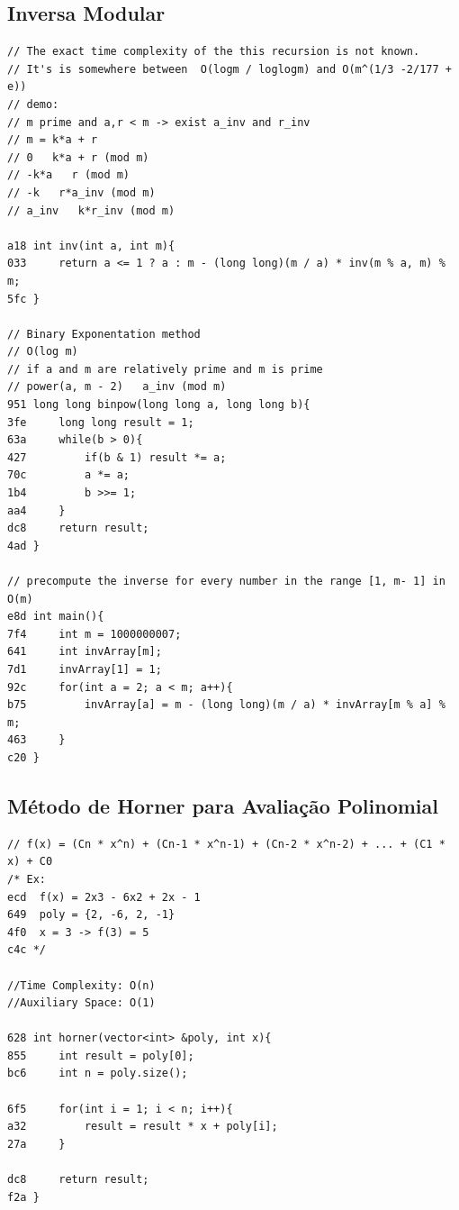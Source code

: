 \documentclass[11pt, a4paper, twoside]{article}
\begin{document}
\subsection{Inversa Modular}
\begin{lstlisting}
// The exact time complexity of the this recursion is not known. 
// It's is somewhere between  O(logm / loglogm) and O(m^(1/3 -2/177 + e))
// demo:
// m prime and a,r < m -> exist a_inv and r_inv
// m = k*a + r
// 0   k*a + r (mod m)
// -k*a   r (mod m)
// -k   r*a_inv (mod m)
// a_inv   k*r_inv (mod m)

a18 int inv(int a, int m){
033     return a <= 1 ? a : m - (long long)(m / a) * inv(m % a, m) % m;
5fc }

// Binary Exponentation method
// O(log m)
// if a and m are relatively prime and m is prime
// power(a, m - 2)   a_inv (mod m)
951 long long binpow(long long a, long long b){
3fe     long long result = 1;
63a     while(b > 0){
427         if(b & 1) result *= a;
70c         a *= a;
1b4         b >>= 1;
aa4     }
dc8     return result;
4ad }

// precompute the inverse for every number in the range [1, m- 1] in O(m)
e8d int main(){
7f4     int m = 1000000007;
641     int invArray[m];
7d1     invArray[1] = 1;
92c     for(int a = 2; a < m; a++){
b75         invArray[a] = m - (long long)(m / a) * invArray[m % a] % m;
463     }
c20 }
\end{lstlisting}

\subsection{Método de Horner para Avaliação Polinomial}
\begin{lstlisting}
// f(x) = (Cn * x^n) + (Cn-1 * x^n-1) + (Cn-2 * x^n-2) + ... + (C1 * x) + C0
/* Ex:
ecd  f(x) = 2x3 - 6x2 + 2x - 1
649  poly = {2, -6, 2, -1}
4f0  x = 3 -> f(3) = 5
c4c */

//Time Complexity: O(n)
//Auxiliary Space: O(1)

628 int horner(vector<int> &poly, int x){
855     int result = poly[0];
bc6     int n = poly.size();
        
6f5     for(int i = 1; i < n; i++){
a32         result = result * x + poly[i];
27a     }
    
dc8     return result;
f2a }
\end{lstlisting}
\end{document}
